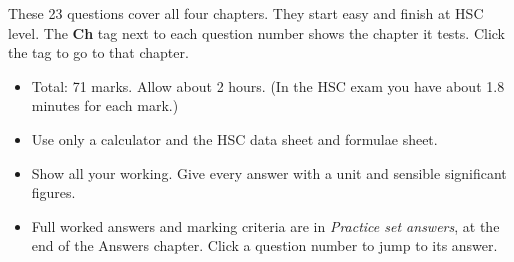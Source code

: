 
\providecommand\practiceMarks[1]{{\unskip\nobreak\hfil\penalty50\hskip1em\hbox{}\nobreak
  \hfill\mbox{\small\textcolor{hscmuted}{(#1)}}\parfillskip=0pt\finalhyphendemerits=0\par}}


These 23 questions cover all four chapters. They start easy and finish at HSC level. The
\textbf{Ch} tag next to each question number shows the chapter it tests. Click the tag to go
to that chapter.
\begin{itemize}
  \item Total: 71 marks. Allow about 2 hours. (In the HSC exam you have about 1.8 minutes for
        each mark.)
  \item Use only a calculator and the HSC data sheet and formulae sheet.
  \item Show all your working. Give every answer with a unit and sensible significant figures.
  \item Full worked answers and marking criteria are in \emph{Practice set answers}, at the end
        of the Answers chapter. Click a question number to jump to its answer.
\end{itemize}

